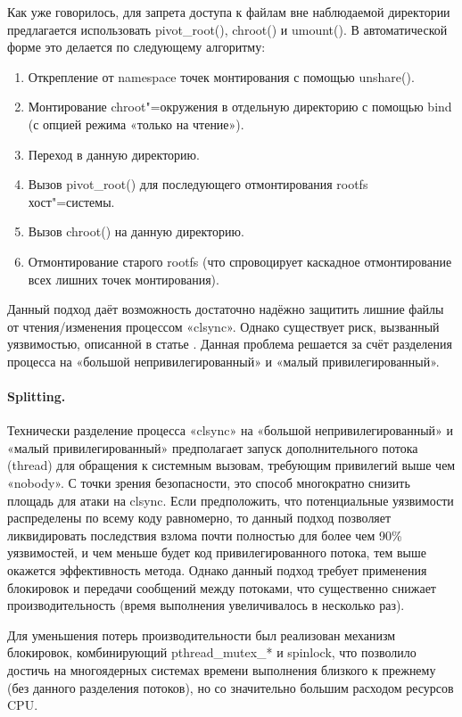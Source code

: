 \documentclass[10pt, a5paper]{article}
\begin{document}
Как уже говорилось, для запрета доступа к файлам вне наблюдаемой директории предлагается использовать pivot\_root(), chroot() и umount(). В автоматической форме это делается по следующему алгоритму:

\begin{enumerate}
  \item Открепление от namespace точек монтирования с помощью unshare().
  \item Монтирование chroot"=окружения в отдельную директорию с помощью bind (с опцией режима «только на чтение»).
  \item Переход в данную директорию.
  \item Вызов pivot\_root() для последующего отмонтирования rootfs хост"=системы.
  \item Вызов chroot() на данную директорию.
  \item Отмонтирование старого rootfs (что спровоцирует каскадное отмонтирование всех лишних точек монтирования).
\end{enumerate}

Данный подход даёт возможность достаточно надёжно защитить лишние файлы от чтения/изменения процессом «clsync». Однако существует риск, вызванный уязвимостью, описанной в статье \cite{Okunev10}. Данная проблема решается за счёт разделения процесса на «большой непривилегированный» и «малый привилегированный».

\paragraph{Splitting.}

Технически разделение процесса «clsync» на «большой непривилегированный» и «малый привилегированный» предполагает запуск дополнительного потока (thread) для обращения к системным вызовам, требующим привилегий выше чем «nobody». С точки зрения безопасности, это способ многократно снизить площадь для атаки на clsync. Если предположить, что потенциальные уязвимости распределены по всему коду равномерно, то данный подход позволяет ликвидировать последствия взлома почти полностью для более чем 90\% уязвимостей, и чем меньше будет код привилегированного потока, тем выше окажется эффективность метода. Однако данный подход требует применения блокировок и передачи сообщений между потоками, что существенно снижает производительность (время выполнения увеличивалось в несколько раз).

Для уменьшения потерь производительности был реализован механизм блокировок, комбинирующий pthread\_mutex\_* и spinlock, что позволило достичь на многоядерных системах времени выполнения близкого к прежнему (без данного разделения потоков), но со значительно большим расходом ресурсов CPU.
\end{document}
